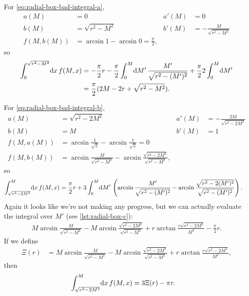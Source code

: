 For \cref{eq:radial-box-bad-integral-a},
\begin{subequations}
\begin{align}
	a(M)
	&= 0
	&
	a'(M)
	&= 0 \\
	b(M)
	&= \sqrt{r^2 - M^2}
	&
	b'(M)
	&= -\frac{M}{\sqrt{r^2 - M^2}} \\
	f(M, b(M))
	&= \arcsin{1} - \arcsin{0}
	= \frac{\pi}{2},
\end{align}
\end{subequations}
so
\begin{subequations}
\begin{align}
	\int_0^{\sqrt{r^2 - M^2}}\! \dif x \, f(M, x)
	&= -\frac{\pi}{2} r
		- \frac{\pi}{2} \int_{0}^M\! \dif M' \, \frac{M'}{\sqrt{r^2 - (M')^2}}
		+ \frac{\pi}{2} 2 \int_{0}^M\! \dif M' \\
	&= \frac{\pi}{2} (2 M - 2 r + \sqrt{r^2 - M^2}).
\end{align}
\end{subequations}

For \cref{eq:radial-box-bad-integral-b},
\begin{subequations}
\begin{align}
	a(M)
	&= \sqrt{r^2 - 2 M^2}
	&
	a'(M)
	&= -\frac{2 M}{\sqrt{r^2 - 2 M^2}} \\
	b(M)
	&= M
	&
	b'(M)
	&= 1 \\
	f(M, a(M))
	&= \arcsin{\frac{1}{\sqrt{2}}} - \arcsin{\frac{1}{\sqrt{2}}}
	= 0 \\
	f(M, b(M))
	&= \arcsin{\frac{M}{\sqrt{r^2 - M^2}}} - \arcsin{\frac{\sqrt{r^2 - 2 M^2}}{\sqrt{r^2 - M^2}}},
\end{align}
\end{subequations}
so
\begin{align}
	\int_{\sqrt{r^2 - 2 M^2}}^M\! \dif x \, f(M, x)
	&= \frac{\pi}{2} r + 3 \int_0^M\! \dif M' \, \left( \arcsin{\frac{M'}{\sqrt{r^2 - (M')^2}}} - \arcsin{\frac{\sqrt{r^2 - 2 (M')^2}}{\sqrt{r^2 - (M')^2}}} \right).
		\label{eq:radial-box-c}
\end{align}
Again it looks like we're not making any progress, but we can actually evaluate the integral over $M'$ (see \vref{lst:radial-box-c}):
\begin{align}
	M \arcsin{\frac{M}{\sqrt{r^2 - M^2}}}
	- M \arcsin{\frac{\sqrt{r^2 - 2 M^2}}{\sqrt{r^2 - M^2}}}
	+ r \arctan{\frac{r \sqrt{r^2 - 2 M^2}}{M^2}}
	- \frac{\pi}{2} r.
\end{align}
If we define
\begin{align}
	\Xi(r)
	&= M \arcsin{\frac{M}{\sqrt{r^2 - M^2}}}
		- M \arcsin{\frac{\sqrt{r^2 - 2 M^2}}{\sqrt{r^2 - M^2}}}
		+ r \arctan{\frac{r \sqrt{r^2 - 2 M^2}}{M^2}},
\end{align}
then
\begin{align}
	\int_{\sqrt{r^2 - 2 M^2}}^M\! \dif x \, f(M, x)
	&= 3 \Xi(r) - \pi r.
\end{align}


